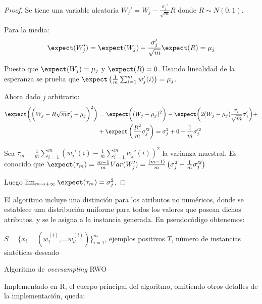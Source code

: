  \begin{proof}
   Se tiene una variable aleatoria $W_j' = W_j - \frac{\sigma_j'}{\sqrt{m}} R$ donde $R\sim N(0,1)$.
  
   Para la media:
   \[
     \expect(W_j') = \expect(W_j) - \frac{\sigma_j'}{\sqrt{m}} \expect(R) = \mu_j
   \]
   
   Puesto que $\expect(W_j) = \mu_j$ y $\expect(R) = 0$. Usando linealidad de la esperanza se prueba que
   $\expect\left(\frac{1}{m} \sum_{i=1}^m w_j'(i)\right) = \mu_j$.
   
   Ahora dado $j$ arbitrario:
   \begin{align*}
     \expect \bigg(\bigg(W_j - R{\sqrt{m}} \sigma_j' - \mu_j\bigg)^2\bigg) &= 
     \expect \bigg((W_j - \mu_j)^2 \bigg) - \expect\bigg( 2 (W_j-\mu_j) \frac{r_i}{\sqrt{m}} \sigma_j' \bigg) + \\
     &+ \expect\left(\frac{R^2}{m} \sigma_j'^2 \right) = \sigma_j^2 + 0 + \frac{1}{m}\sigma_j'^2
   \end{align*}
   
   Sea $\tau_m = \frac{1}{m} \sum_{i=1}^m \left(w_j'(i) - \frac{1}{m} \sum_{i=1}^m w_j'(i)\right)^2$ la varianza muestral.
   Es conocido que $\expect(\tau_m) = \frac{m-1}{m} Var(W_j') = 
   \frac{(m-1)}{m} \left(\sigma_j^2 + \frac{1}{m} \sigma_j'^2\right)$

   Luego $\lim_{m\rightarrow + \infty} \expect(\tau_m) = \sigma_j^2$.
  \end{proof}

El algoritmo incluye una distinción para los atributos no numéricos, donde se establece una distribución uniforme
para todos los valores que posean dichos atributos, y se le asigna a la instancia generada. En pseudocódigo
obtenemos:

\begin{algorithm}[H]
\begin{algorithmic}[1]
  \REQUIRE $S = \{x_i=(w_1^{(i)}, \ldots w_d^{(i)})\}_{i=1}^m$, ejemplos positivos
  \REQUIRE $T$, número de instancias sintéticas deseado
  \NEWLINE
    \ENDIF
  \ENDFOR
  \NEWLINE
	 \ELSE
	 \ENDIF
      \ENDFOR
    \ENDFOR
  \ENDFOR
  \NEWLINE
\end{algorithmic}
\caption{Algoritmo de \textit{oversampling} RWO}
\label{alg:rwo}
\end{algorithm}

Implementado en R, el cuerpo principal del algoritmo, omitiendo otros detalles de la implementación, queda:

